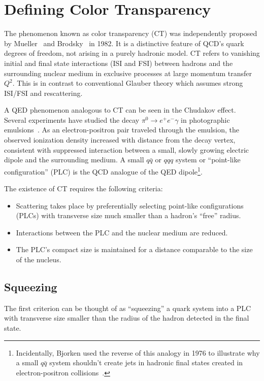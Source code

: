 \section{Defining Color Transparency}\label{sec:ct_def}
The phenomenon known as color transparency (CT) was independently proposed by
Mueller~\cite{Mueller_1982} and Brodsky~\cite{Brodsky_1982} in 1982.
It is a distinctive feature of QCD's quark degrees of freedom, not arising in a
purely hadronic model.
CT refers to vanishing initial and final state interactions (ISI and FSI)
between hadrons and the surrounding nuclear medium in exclusive processes
at large momentum transfer $Q^2$.
This is in contrast to conventional Glauber theory which assumes strong ISI/FSI
and rescattering.


A QED phenomenon analogous to CT can be seen in the Chudakov effect.
Several experiments have studied the decay $\pi^0 \rightarrow e^+ e^- \gamma$
in photographic emulsions~\cite{Perkins_1955, Fowler_1955, Wolter_1956,
Iwadare_1958, Varfolomeev_1959, Zielinski_1985}.
As an electron-positron pair traveled through the emulsion,
the observed ionization density increased with distance from the decay vertex,
consistent with suppressed interaction between a
small, slowly growing electric dipole and the surrounding medium.
A small $q\bar{q}$ or $qqq$ system or ``point-like configuration'' (PLC) is the
QCD analogue of the QED dipole\footnote{Incidentally, Bjorken used
the reverse of this analogy in 1976 to illustrate why a small
$q\bar{q}$ system shouldn't create jets in hadronic final
states created in electron-positron collisions~\cite{Bjorken_1976}.}.


The existence of CT requires the following criteria:
\begin{itemize}
    \item Scattering takes place by preferentially selecting point-like
          configurations (PLCs) with transverse size much smaller than a
          hadron's ``free'' radius.
    \item Interactions between the PLC and the nuclear medium are reduced.
    \item The PLC's compact size is maintained for a distance comparable to the
          size of the nucleus.
\end{itemize}


\subsection{Squeezing}
The first criterion can be thought of as ``squeezing'' a quark system into a
PLC with transverse size smaller than the radius of the hadron detected in
the final state.



